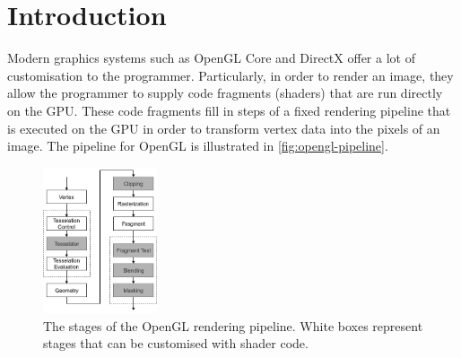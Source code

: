 \documentclass[format=sigconf]{acmart}
\begin{document}


\maketitle

\newpage

\def\abovecaptionskip{1pt}
\def\listingautorefname{Listing}
\def\figureautorefname{Figure}

\section{Introduction}\label{introduction}
Modern graphics systems such as OpenGL Core and DirectX offer a lot of customisation to the programmer. Particularly, in order to render an image, they allow the programmer to supply code fragments (shaders) that are run directly on the GPU. These code fragments fill in steps of a fixed rendering pipeline that is executed on the GPU in order to transform vertex data into the pixels of an image. The pipeline for OpenGL is illustrated in \autoref{fig:opengl-pipeline}. \\

\begin{figure}[h]
  \begin{center}
    \includegraphics[width=0.3\textwidth]{opengl-pipeline.png}
  \end{center}
  \caption{The stages of the OpenGL rendering pipeline. White boxes represent stages that can be customised with shader code.}
  \label{fig:opengl-pipeline}
\end{figure}
\end{document}
